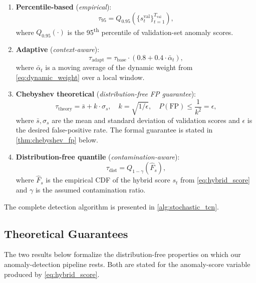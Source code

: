 \begin{enumerate}[leftmargin=*, nosep]
    \item \textbf{Percentile-based} (\emph{empirical}):
    \begin{equation}
    \tau_{95} = Q_{0.95}\!\left(\{s_t^{\text{val}}\}_{t=1}^{T_{\text{val}}}\right),
    \label{eq:tau_percentile}
    \end{equation}
    where $Q_{0.95}(\cdot)$ is the 95\textsuperscript{th} percentile of validation-set anomaly scores.
    \item \textbf{Adaptive} (\emph{context-aware}):
    \begin{equation}
    \tau_{\text{adapt}} = \tau_{\text{base}} \cdot \left(0.8 + 0.4 \cdot \bar{\alpha}_t\right),
    \label{eq:tau_adaptive}
    \end{equation}
    where $\bar{\alpha}_t$ is a moving average of the dynamic weight from \cref{eq:dynamic_weight} over a local window.
    \item \textbf{Chebyshev theoretical} (\emph{distribution-free FP guarantee}):
    \begin{equation}
    \tau_{\text{theory}} = \bar{s} + k \cdot \sigma_s, \quad k = \sqrt{1/\epsilon}, \quad P(\text{FP}) \leq \frac{1}{k^2} = \epsilon,
    \label{eq:tau_chebyshev}
    \end{equation}
    where $\bar{s}, \sigma_s$ are the mean and standard deviation of validation scores and $\epsilon$ is the desired false-positive rate. The formal guarantee is stated in \cref{thm:chebyshev_fp} below.
    \item \textbf{Distribution-free quantile} (\emph{contamination-aware}):
    \begin{equation}
    \tau_{\text{dist}} = Q_{1-\gamma}\!\left(\hat{F}_{s}\right),
    \label{eq:tau_distfree}
    \end{equation}
    where $\hat{F}_{s}$ is the empirical CDF of the hybrid score $s_t$ from \cref{eq:hybrid_score} and $\gamma$ is the assumed contamination ratio.
\end{enumerate}

The complete detection algorithm is presented in \cref{alg:stochastic_tcn}.



\subsection{Theoretical Guarantees}
\label{sec:theoretical_guarantees}

The two results below formalize the distribution-free properties on which our anomaly-detection pipeline rests. Both are stated for the anomaly-score variable produced by \cref{eq:hybrid_score}.

